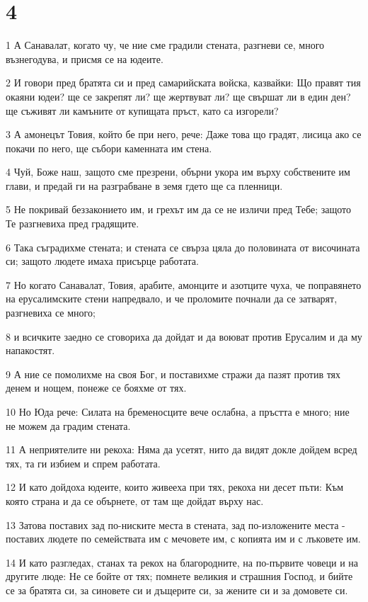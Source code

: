 \chapter{4}

\par 1 А Санавалат, когато чу, че ние сме градили стената, разгневи се, много възнегодува, и присмя се на юдеите.
\par 2 И говори пред братята си и пред самарийската войска, казвайки: Що правят тия окаяни юдеи? ще се закрепят ли? ще жертвуват ли? ще свършат ли в един ден? ще съживят ли камъните от купищата пръст, като са изгорели?
\par 3 А амонецът Товия, който бе при него, рече: Даже това що градят, лисица ако се покачи по него, ще събори каменната им стена.
\par 4 Чуй, Боже наш, защото сме презрени, обърни укора им върху собствените им глави, и предай ги на разграбване в земя гдето ще са пленници.
\par 5 Не покривай беззаконието им, и грехът им да се не изличи пред Тебе; защото Те разгневиха пред градящите.
\par 6 Така съградихме стената; и стената се свърза цяла до половината от височината си; защото людете имаха присърце работата.
\par 7 Но когато Санавалат, Товия, арабите, амонците и азотците чуха, че поправянето на ерусалимските стени напредвало, и че проломите почнали да се затварят, разгневиха се много;
\par 8 и всичките заедно се сговориха да дойдат и да воюват против Ерусалим и да му напакостят.
\par 9 А ние се помолихме на своя Бог, и поставихме стражи да пазят против тях денем и нощем, понеже се бояхме от тях.
\par 10 Но Юда рече: Силата на бременосците вече ослабна, а пръстта е много; ние не можем да градим стената.
\par 11 А неприятелите ни рекоха: Няма да усетят, нито да видят докле дойдем всред тях, та ги избием и спрем работата.
\par 12 И като дойдоха юдеите, които живееха при тях, рекоха ни десет пъти: Към която страна и да се обърнете, от там ще дойдат върху нас.
\par 13 Затова поставих зад по-ниските места в стената, зад по-изложените места - поставих людете по семействата им с мечовете им, с копията им и с лъковете им.
\par 14 И като разгледах, станах та рекох на благородните, на по-първите човеци и на другите люде: Не се бойте от тях; помнете великия и страшния Господ, и бийте се за братята си, за синовете си и дъщерите си, за жените си и за домовете си.
